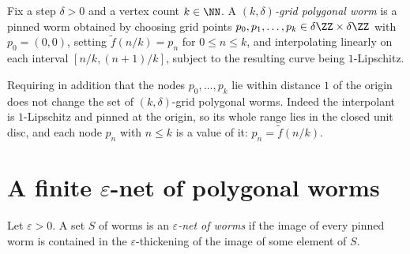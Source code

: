 \begin{definition}
    \label{def:gridPolygonalWorm}
    Fix a step $\delta > 0$ and a vertex count $k \in \NN$. A
    \emph{$(k,\delta)$-grid polygonal worm} is a pinned worm obtained by
    choosing grid points $p_0, p_1, \dots, p_k \in \delta\ZZ \times \delta\ZZ$
    with $p_0 = (0,0)$, setting $\tilde f(n/k) = p_n$ for $0 \le n \le k$, and
    interpolating linearly on each interval $[n/k, (n+1)/k]$, subject to the
    resulting curve being $1$-Lipschitz.
\end{definition}

\begin{lemma}
    \label{lem:gridNodesInDisc}
    \leanok
    Requiring in addition that the nodes $p_0, \dots, p_k$ lie within distance
    $1$ of the origin does not change the set of $(k,\delta)$-grid polygonal
    worms. Indeed the interpolant is $1$-Lipschitz and pinned at the origin, so
    its whole range lies in the closed unit disc, and each node $p_n$ with
    $n \le k$ is a value of it: $p_n = \tilde f(n/k)$.
\end{lemma}

\section{A finite \texorpdfstring{$\varepsilon$}{epsilon}-net of polygonal worms}

\begin{definition}
    \label{def:epsilonNet}
    Let $\varepsilon > 0$. A set $S$ of worms is an \emph{$\varepsilon$-net of
    worms} if the image of every pinned worm is contained in the
    $\varepsilon$-thickening of the image of some element of $S$.
\end{definition}

